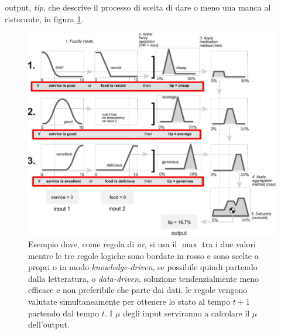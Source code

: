 \documentclass[a4paper,12pt, oneside]{book}
\begin{document}
output, \textit{tip}, che descrive il processo di scelta di dare o meno una
manca al ristorante, in figura \ref{fig:fuze}.
\begin{figure}
  \centering
  \includegraphics[scale = 1]{img/fuze.jpg}
  \caption{Esempio dove, come regola di \textit{or}, si usa il $\max$
    tra i due 
    valori mentre le tre regole logiche sono bordate in rosso e sono scelte a
    propri 
    o in modo \textit{knowledge-driven}, se possibile quindi partendo dalla
    letteratura, o \textit{data-driven}, soluzione tendenzialmente meno efficace
    e non preferibile  che parte dai dati. le regole vengono valutate
    simultaneamente per ottenere lo stato al tempo $t+1$ partendo dal tempo
    $t$. I 
    $\mu$ degli input serviranno a calcolare il $\mu$ dell'output.}
  \label{fig:fuze}
\end{figure}
\newpage
\end{document}
